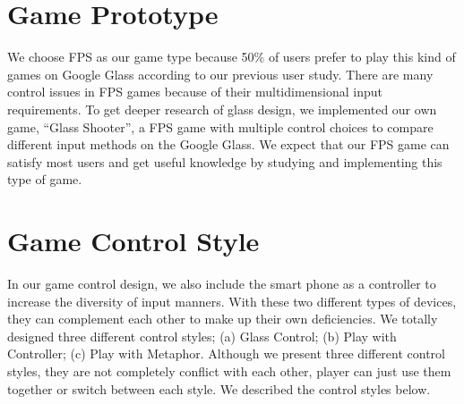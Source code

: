 \documentclass{sigchi}
\begin{document}

\section{Game Prototype}
We choose FPS as our game type because 50\% of users prefer to play this kind of games on Google Glass according to our previous user study. There are many control issues in FPS games because of their multidimensional input requirements. To get deeper research of glass design, we implemented our own game, ``Glass Shooter'', a FPS game with multiple control choices to compare different input methods on the Google Glass. We expect that our FPS game can satisfy most users and get useful knowledge by studying and implementing this type of game.

\section{Game Control Style}
In our game control design, we also include the smart phone as a controller to increase the diversity of input manners. With these two different types of devices, they can complement each other to make up their own deficiencies. We totally designed three different control styles; (a) Glass Control; (b) Play with Controller; (c) Play with Metaphor. Although we present three different control styles, they are not completely conflict with each other, player can just use them together or switch between each style. We described the control styles below.
\end{document}
